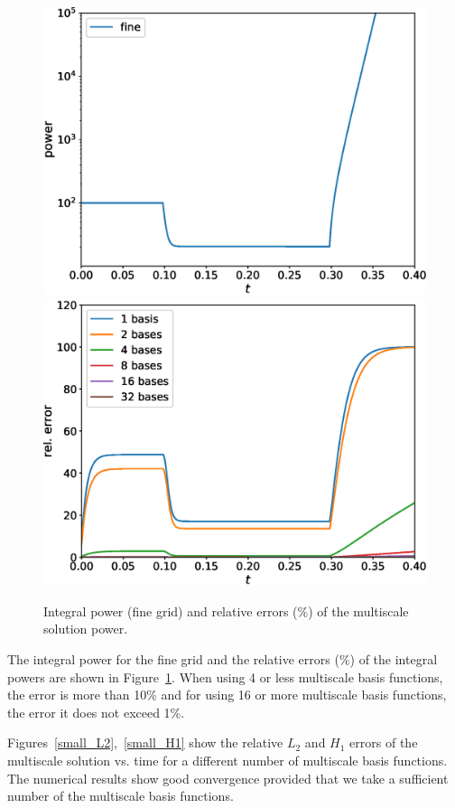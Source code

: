 \documentclass[preprint]{elsarticle}
\begin{document}
\begin{figure}[ht]
	\centering
		\includegraphics[width=0.45\linewidth]{small/power_fine.eps} \hspace{2em}
		\includegraphics[width=0.45\linewidth]{small/power_error.eps}
	\caption{Integral power (fine grid) and relative errors ($\%$) of the multiscale solution power.}
	\label{small_power}
\end{figure}
 
The integral power for the fine grid and the relative errors ($\%$) of the integral powers are shown in Figure~\ref{small_power}.
When using 4 or less multiscale basis functions, the error is more than 10\% and for using 16 or more multiscale basis functions, the error it does not exceed 1\%.

Figures~\ref{small_L2},~\ref{small_H1} show the relative $L_2$ and $H_1$ errors of the multiscale solution vs. time for a different number of multiscale basis functions.
The numerical results show good convergence provided that we take a sufficient number of the multiscale basis functions.
\end{document}
